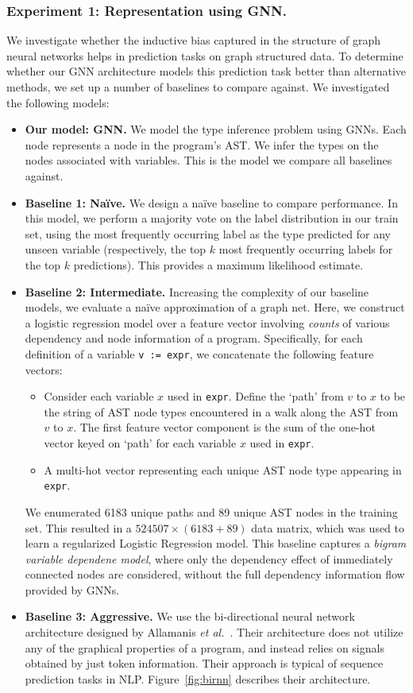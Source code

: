 \subsubsection{Experiment 1: Representation using GNN.}
We investigate whether the inductive bias captured in the structure of graph neural networks helps in prediction tasks on graph structured data.
To determine whether our GNN architecture models this prediction task better than alternative methods, we set up a number of baselines to compare against.
We investigated the following models:
\begin{itemize}[noitemsep,topsep=0pt]
\item \textbf{Our model: GNN.}
  We model the type inference problem using GNNs.
  Each node represents a node in the program's AST.
  We infer the types on the nodes associated with variables.
  This is the model we compare all baselines against.
\item \textbf{Baseline 1: Na\"ive.}
  We design a na\"ive baseline to compare performance.
  In this model, we perform a majority vote on the label distribution in our train set, using the most frequently occurring label as the type predicted for any unseen variable (respectively, the top $k$ most frequently occurring labels for the top $k$ predictions).
  This provides a maximum likelihood estimate.
\item \textbf{Baseline 2: Intermediate.}
  Increasing the complexity of our baseline models, we evaluate a na\"ive approximation of a graph net.
  Here, we construct a logistic regression model over a feature vector involving \textit{counts} of various dependency and node information of a program.
  Specifically, for each definition of a variable \texttt{v := expr}, we concatenate the following feature vectors:
  \begin{itemize}[noitemsep,topsep=0pt]
  \item Consider each variable $x$ used in \texttt{expr}.
    Define the `path' from $v$ to $x$ to be the string of AST node types encountered in a walk along the AST from $v$ to $x$.
    The first feature vector component is the sum of the one-hot vector keyed on `path' for each variable $x$ used in \texttt{expr}.
  \item A multi-hot vector representing each unique AST node type appearing in \texttt{expr}.
  \end{itemize}
  We enumerated 6183 unique paths and 89 unique AST nodes in the training set.
  This resulted in a $524507 \times (6183+89)$ data matrix, which was used to learn a regularized Logistic Regression model.
  This baseline captures a \textit{bigram variable dependene model}, where only the dependency effect of immediately connected nodes are considered, without the full dependency information flow provided by GNNs.
\item \textbf{Baseline 3: Aggressive.}
  We use the bi-directional neural network architecture designed by Allamanis \textit{et al.}~\cite{hellendoorn2018deep}.
  Their architecture does not utilize any of the graphical properties of a program, and instead relies on signals obtained by just token information.
  Their approach is typical of sequence prediction tasks in NLP.
  Figure~\ref{fig:birnn} describes their architecture.
\end{itemize}
